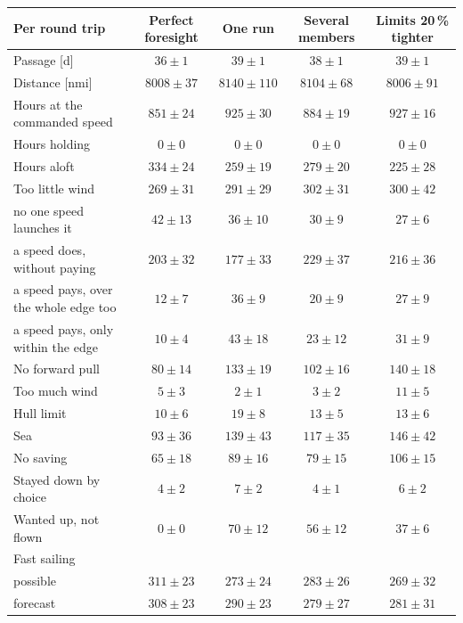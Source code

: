 \begin{tabular}{@{}lcccc@{}}
\toprule
Per round trip & Perfect foresight & One run & Several members & Limits 20\,\% tighter \\
\midrule
Passage [d] & \(36 \pm 1\) & \(39 \pm 1\) & \(38 \pm 1\) & \(39 \pm 1\) \\
Distance [nmi] & \(8008 \pm 37\) & \(8140 \pm 110\) & \(8104 \pm 68\) & \(8006 \pm 91\) \\
Hours at the commanded speed & \(851 \pm 24\) & \(925 \pm 30\) & \(884 \pm 19\) & \(927 \pm 16\) \\
Hours holding & \(0 \pm 0\) & \(0 \pm 0\) & \(0 \pm 0\) & \(0 \pm 0\) \\
Hours aloft & \(334 \pm 24\) & \(259 \pm 19\) & \(279 \pm 20\) & \(225 \pm 28\) \\
Too little wind & \(269 \pm 31\) & \(291 \pm 29\) & \(302 \pm 31\) & \(300 \pm 42\) \\
\quad no one speed launches it & \(42 \pm 13\) & \(36 \pm 10\) & \(30 \pm 9\) & \(27 \pm 6\) \\
\quad a speed does, without paying & \(203 \pm 32\) & \(177 \pm 33\) & \(229 \pm 37\) & \(216 \pm 36\) \\
\quad a speed pays, over the whole edge too & \(12 \pm 7\) & \(36 \pm 9\) & \(20 \pm 9\) & \(27 \pm 9\) \\
\quad a speed pays, only within the edge & \(10 \pm 4\) & \(43 \pm 18\) & \(23 \pm 12\) & \(31 \pm 9\) \\
No forward pull & \(80 \pm 14\) & \(133 \pm 19\) & \(102 \pm 16\) & \(140 \pm 18\) \\
Too much wind & \(5 \pm 3\) & \(2 \pm 1\) & \(3 \pm 2\) & \(11 \pm 5\) \\
Hull limit & \(10 \pm 6\) & \(19 \pm 8\) & \(13 \pm 5\) & \(13 \pm 6\) \\
Sea & \(93 \pm 36\) & \(139 \pm 43\) & \(117 \pm 35\) & \(146 \pm 42\) \\
No saving & \(65 \pm 18\) & \(89 \pm 16\) & \(79 \pm 15\) & \(106 \pm 15\) \\
Stayed down by choice & \(4 \pm 2\) & \(7 \pm 2\) & \(4 \pm 1\) & \(6 \pm 2\) \\
Wanted up, not flown & \(0 \pm 0\) & \(70 \pm 12\) & \(56 \pm 12\) & \(37 \pm 6\) \\
Fast sailing &  &  &  &  \\
\quad possible & \(311 \pm 23\) & \(273 \pm 24\) & \(283 \pm 26\) & \(269 \pm 32\) \\
\quad forecast & \(308 \pm 23\) & \(290 \pm 23\) & \(279 \pm 27\) & \(281 \pm 31\) \\

\end{tabular}
